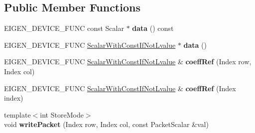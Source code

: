 \subsection*{Public Member Functions}
\begin{DoxyCompactItemize}
\item 
\mbox{\label{class_eigen_1_1_map_base_3_01_derived_00_01_write_accessors_01_4_a4e34c02d73028e06e3763009abab0398}} 
E\+I\+G\+E\+N\+\_\+\+D\+E\+V\+I\+C\+E\+\_\+\+F\+U\+NC const Scalar $\ast$ {\bfseries data} () const
\item 
\mbox{\label{class_eigen_1_1_map_base_3_01_derived_00_01_write_accessors_01_4_a3423792f520c05c542caccc54f2a0c82}} 
E\+I\+G\+E\+N\+\_\+\+D\+E\+V\+I\+C\+E\+\_\+\+F\+U\+NC \mbox{\hyperlink{struct_eigen_1_1internal_1_1true__type}{Scalar\+With\+Const\+If\+Not\+Lvalue}} $\ast$ {\bfseries data} ()
\item 
\mbox{\label{class_eigen_1_1_map_base_3_01_derived_00_01_write_accessors_01_4_ac076a38c2b84ac6628ec3b56a643a706}} 
E\+I\+G\+E\+N\+\_\+\+D\+E\+V\+I\+C\+E\+\_\+\+F\+U\+NC \mbox{\hyperlink{struct_eigen_1_1internal_1_1true__type}{Scalar\+With\+Const\+If\+Not\+Lvalue}} \& {\bfseries coeff\+Ref} (Index row, Index col)
\item 
\mbox{\label{class_eigen_1_1_map_base_3_01_derived_00_01_write_accessors_01_4_a34608cf1fd4e4e244197057fbcba142d}} 
E\+I\+G\+E\+N\+\_\+\+D\+E\+V\+I\+C\+E\+\_\+\+F\+U\+NC \mbox{\hyperlink{struct_eigen_1_1internal_1_1true__type}{Scalar\+With\+Const\+If\+Not\+Lvalue}} \& {\bfseries coeff\+Ref} (Index index)
\item 
\mbox{\label{class_eigen_1_1_map_base_3_01_derived_00_01_write_accessors_01_4_a7caddcdb9331c5bb3a81f92f65997778}} 
{\footnotesize template$<$int Store\+Mode$>$ }\\void {\bfseries write\+Packet} (Index row, Index col, const Packet\+Scalar \&val)
\item 
\mbox{\label{class_eigen_1_1_map_base_3_01_derived_00_01_write_accessors_01_4_a963656f086c7a9a22acd4aee8a9b980d}} 

\end{DoxyCompactItemize}
